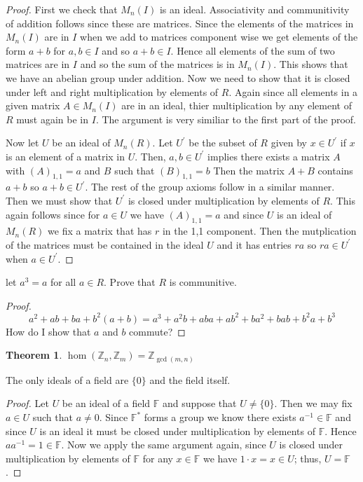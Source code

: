\documentclass[11pt,largemargins]{homework}
\newcommand{\F}{\mathbb{F}}
\newcommand{\Z}{\mathbb{Z}}
\newtheorem{theorem}{Theorem}
\begin{document}
\begin{proof}
    First we check that $M_n(I)$ is an ideal. Associativity and communitivity of addition follows since these are 
    matrices. Since the elements of the matrices in $M_n(I)$ are in $I$ when we add to matrices component wise 
    we get elements of the form $a + b$ for $a, b \in I$ and so $a + b \in I$. Hence all elements of the sum of two matrices 
    are in $I$ and so the sum of the matrices is in $M_n(I)$. This shows that we have an abelian group under addition. 
    Now we need to show that it is closed under left and right multiplication by elements of $R$. Again since all elements 
    in a given matrix $A \in M_n(I)$ are in an ideal, thier multiplication by any element of $R$ must again be in $I$. The argument
    is very similiar to the first part of the proof. 

    Now let $U$ be an ideal of $M_n(R)$. Let $U^\prime$ be the subset of $R$ given by $x \in U^\prime$ if $x$ is an element 
    of a matrix in $U$. Then, $a, b \in U^\prime$ implies there exists a matrix $A$ with $(A)_{1,1} = a$ and $B$ such that $(B)_{1,1} = b$
    Then the matrix $A + B $ contains $a + b$ so $a + b \in U^\prime$. The rest of the group axioms follow in a similar manner. Then we must 
    show that $U^\prime$ is closed under multiplication by elements of $R$. This again follows since for $a \in U$ we have $(A)_{1,1} = a$ and 
    since $U$ is an ideal of $M_n(R)$ we fix a matrix that has $r$ in the 1,1 component. Then the mutplication of the matrices must be contained in 
    the ideal $U$ and it has entries $ra$ so $ra \in U^\prime$ when $a \in U^\prime$. 
\end{proof}


let $a^3 = a$ for all $a \in R$. Prove that $R$ is communitive. 

\begin{proof}
    \[a^2 + ab + ba + b^2 (a + b) = a^3 + a^2b + aba + ab^2 + ba^2 + bab + b^2a + b^3\] 
    How do I show that $a$ and $b$ commute?
\end{proof}
\begin{theorem}
    $\hom(\Z_n, \Z_m) = \Z_{\gcd(m, n)}$ 
\end{theorem}

The only ideals of a field are $\{0\}$ and the field itself. 

\begin{proof}
    Let $U$ be an ideal of a field $\F$ and suppose that $U \neq \{0\}$. Then we may fix 
    $a \in U$ such that $a \neq 0$. Since $\F^*$ forms a group we know there exists $a^{-1} \in \F$ and 
    since $U$ is an ideal it must be closed under multiplication by elements of $\F$. Hence $aa^{-1} = 1 \in \F$. 
    Now we apply the same argument again, since $U$ is closed under multiplication by elements of $\F$ for any $x \in \F$
    we have $1 \cdot x = x \in U$; thus, $U = \F$. 
\end{proof}
\end{document}
